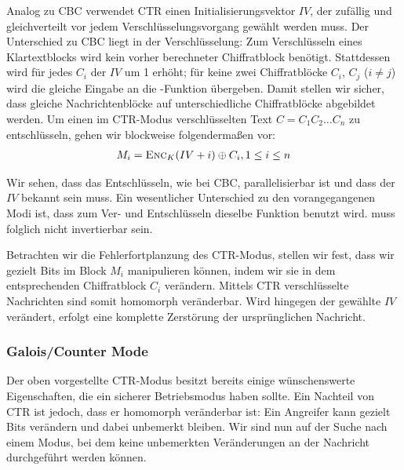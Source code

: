 Analog zu CBC verwendet CTR einen Initialisierungsvektor $IV$, der zufällig und gleichverteilt vor jedem Verschlüsselungsvorgang gewählt werden muss. Der Unterschied zu CBC liegt in der Verschlüsselung: Zum Verschlüsseln eines Klartextblocks wird kein vorher berechneter Chiffratblock benötigt. Stattdessen wird für jedes $C_i$ der $IV$ um 1 erhöht; für keine zwei Chiffratblöcke $C_i$, $C_j$ ($i \neq j$) wird die gleiche Eingabe an die \enc-Funktion übergeben. Damit stellen wir sicher, dass gleiche Nachrichtenblöcke auf unterschiedliche Chiffratblöcke abgebildet werden. Um einen im CTR-Modus verschlüsselten Text $C = C_1C_2 \dots C_n$ zu entschlüsseln, gehen wir blockweise folgendermaßen vor:
\begin{align*}
	M_i = \textsc{Enc}_{K}(IV + i) \oplus C_i{,}\, 1 \leq i \leq n
\end{align*}

Wir sehen, dass das Entschlüsseln, wie bei CBC, parallelisierbar ist und dass der $IV$ bekannt sein muss. Ein wesentlicher Unterschied zu den vorangegangenen Modi ist, dass zum Ver- und Entschlüsseln dieselbe Funktion \enc benutzt wird. \enc muss folglich nicht invertierbar sein.

Betrachten wir die Fehlerfortplanzung des CTR-Modus, stellen wir fest, dass wir gezielt Bits im Block $M_i$ manipulieren können, indem wir sie in dem entsprechenden Chiffratblock $C_i$ verändern. Mittels CTR verschlüsselte Nachrichten sind somit homomorph veränderbar. Wird hingegen der gewählte $IV$ verändert, erfolgt eine komplette Zerstörung der ursprünglichen Nachricht. 

\subsubsection{Galois/Counter Mode}
Der oben vorgestellte CTR-Modus besitzt bereits einige wünschenswerte Eigenschaften, die ein sicherer Betriebsmodus haben sollte. Ein Nachteil von CTR ist jedoch, dass er homomorph veränderbar ist: Ein Angreifer kann gezielt Bits verändern und dabei unbemerkt bleiben. Wir sind nun auf der Suche nach einem Modus, bei dem keine unbemerkten Veränderungen an der Nachricht durchgeführt werden können.

